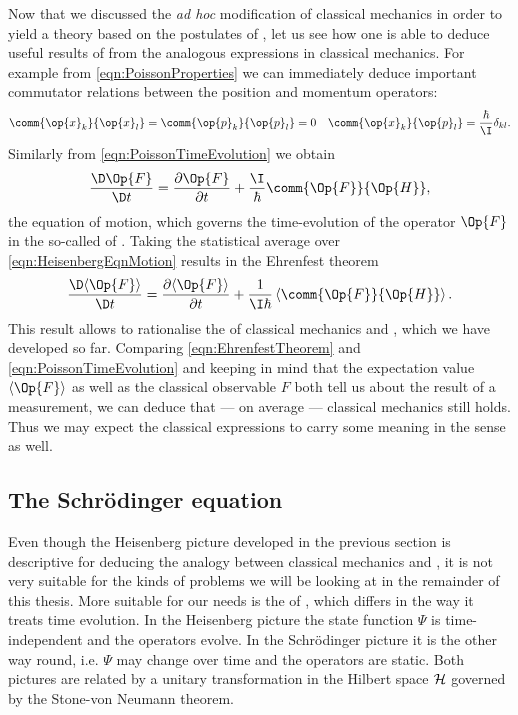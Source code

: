 Now that we discussed the \textit{ad hoc} modification of classical mechanics
in order to yield a theory based on the postulates of \QM,
let us see how one is able to deduce useful results of \QM
from the analogous expressions in classical mechanics.
For example from \eqref{eqn:PoissonProperties} we can immediately
deduce important commutator relations between the position and momentum operators:
\begin{align}
	\comm{\op{x}_k}{\op{x}_l} &= \comm{\op{p}_k}{\op{p}_l} = 0 & \comm{\op{x}_k}{\op{p}_l} = \frac{\hbar}{\I} \delta_{kl}.
	\label{eqn:compatibilityOperator}
\end{align}
Similarly from \eqref{eqn:PoissonTimeEvolution} we obtain
\begin{equation}
	\frac{\D \Op{F}}{\D t} = \frac{\partial \Op{F}}{\partial t} + \frac{\I}{\hbar} \comm{\Op{F}}{\Op{H}},
	\label{eqn:HeisenbergEqnMotion}
\end{equation}
the equation of motion, which governs the time-evolution of the operator $\Op{F}$
in the so-called  of \QM.
Taking the statistical average over \eqref{eqn:HeisenbergEqnMotion}
results in the Ehrenfest theorem
\begin{equation}
	\frac{\D \langle \Op{F} \rangle}{\D t} = \frac{\partial \langle \Op{F} \rangle}{\partial t} + \frac{1}{\I \hbar} \left\langle \comm{\Op{F}}{\Op{H}} \right\rangle.
	\label{eqn:EhrenfestTheorem}
\end{equation}
This result allows to rationalise the 
of classical mechanics and \QM,
which we have developed so far.
Comparing \eqref{eqn:EhrenfestTheorem} and \eqref{eqn:PoissonTimeEvolution}
and keeping in mind that the expectation value $\langle \Op{F} \rangle$
as well as the classical observable $F$ both tell us about the result
of a measurement,
we can deduce that --- on average --- classical mechanics still holds.
Thus we may expect the classical expressions to carry some meaning
in the \QM sense as well.

\subsection{The Schrödinger equation}
Even though the Heisenberg picture developed
in the previous section is descriptive for deducing the analogy between
classical mechanics and \QM,
it is not very suitable for the kinds of problems we will be looking
at in the remainder of this thesis.
More suitable for our needs is the  of \QM,
which differs in the way it treats time evolution.
In the Heisenberg picture the state function $\Psi$ is time-independent
and the operators evolve.
In the Schrödinger picture it is the other way round, i.e. $\Psi$ may change over time
and the operators are static.
Both pictures are related by a unitary transformation
in the Hilbert space $\mathcal{H}$
governed by the Stone-von Neumann theorem.


